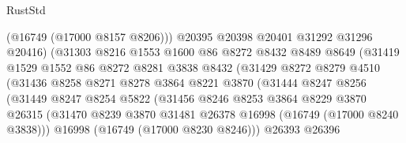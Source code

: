 \begin{lexlean}{RustStd}
\begin{coremodule}
                                (@16749 (@17000 @8157 @8206)))
                              @20395
                              @20398
                              @20401
                              @31292
                              @31296
                              @20416)
                            (@31303
                              @8216
                              @1553
                              @1600
                              @86
                              @8272
                              @8432
                              @8489
                              @8649
                              (@31419
                                @1529
                                @1552
                                @86
                                @8272
                                @8281
                                @3838
                                @8432
                                (@31429
                                  @8272
                                  @8279
                                  @4510
                                  (@31436
                                    @8258
                                    @8271
                                    @8278
                                    @3864
                                    @8221
                                    @3870
                                    (@31444
                                      @8247
                                      @8256
                                      (@31449
                                        @8247
                                        @8254
                                        @5822
                                        (@31456
                                          @8246
                                          @8253
                                          @3864
                                          @8229
                                          @3870
                                          @26315
                                          (@31470
                                            @8239
                                            @3870
                                            @31481
                                            @26378
                                            @16998
                                            (@16749 (@17000 @8240 @3838)))
                                          @16998
                                          (@16749 (@17000 @8230 @8246)))
                                        @26393
                                        @26396

\end{coremodule}
\end{lexlean}
